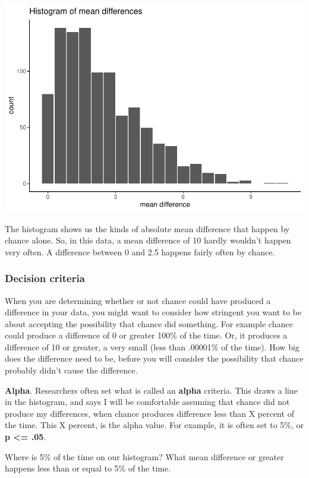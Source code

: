 \documentclass[]{book}
\begin{document}
\includegraphics{Statistics_Lab_files/figure-latex/unnamed-chunk-149-1.pdf}

The histogram shows us the kinds of absolute mean difference that happen
by chance alone. So, in this data, a mean difference of 10 hardly
wouldn't happen very often. A difference between 0 and 2.5 happens
fairly often by chance.

\subsubsection{Decision criteria}\label{decision-criteria}

When you are determining whether or not chance could have produced a
difference in your data, you might want to consider how stringent you
want to be about accepting the possibility that chance did something.
For example chance could produce a difference of 0 or greater 100\% of
the time. Or, it produces a difference of 10 or greater, a very small
(less than .00001\% of the time). How big does the difference need to
be, before you will consider the possibility that chance probably didn't
cause the difference.

\textbf{Alpha}. Researchers often set what is called an \textbf{alpha}
criteria. This draws a line in the histogram, and says I will be
comfortable assuming that chance did not produce my differences, when
chance produces difference less than X percent of the time. This X
percent, is the alpha value. For example, it is often set to 5\%, or
\textbf{p \textless{}= .05}.

Where is 5\% of the time on our histogram? What mean difference or
greater happens less than or equal to 5\% of the time.
\end{document}
